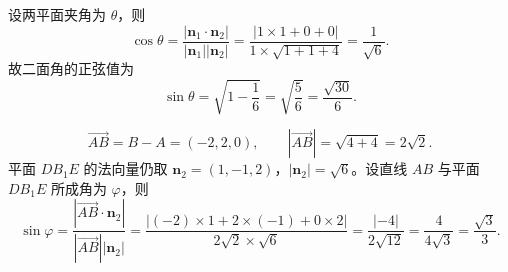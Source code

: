 \begin{answer}
设两平面夹角为 $\theta$，则
\nopagebreak[4]
\[\cos\theta=\frac{|\boldsymbol n_1\cdot\boldsymbol n_2|}{|\boldsymbol n_1||\boldsymbol n_2|}=\frac{|1\times1+0+0|}{1\times\sqrt{1+1+4}}=\frac1{\sqrt6} .\]
故二面角的正弦值为
\nopagebreak[4]
\[\sin\theta=\sqrt{1-\frac16}=\sqrt{\frac56}=\frac{\sqrt{30}}6 .\]


\nopagebreak[4]
\[\overrightarrow{AB}=B-A=(-2,2,0),\qquad |\overrightarrow{AB}|=\sqrt{4+4}=2\sqrt2 .\]
平面 $DB_1E$ 的法向量仍取 $\boldsymbol n_2=(1,-1,2)$，$|\boldsymbol n_2|=\sqrt6$。设直线 $AB$ 与平面 $DB_1E$ 所成角为 $\varphi$，则
\nopagebreak[4]
\[\sin\varphi=\frac{|\overrightarrow{AB}\cdot\boldsymbol n_2|}{|\overrightarrow{AB}||\boldsymbol n_2|}=\frac{|(-2)\times1+2\times(-1)+0\times2|}{2\sqrt2\times\sqrt6}=\frac{|-4|}{2\sqrt{12}}=\frac4{4\sqrt3}=\frac{\sqrt3}3 .\]




\end{answer}

